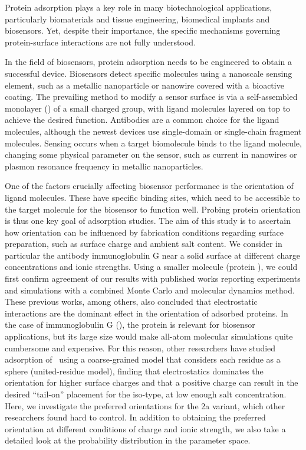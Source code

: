 
Protein adsorption plays a key role in many biotechnological applications, particularly biomaterials and tissue engineering, biomedical implants and biosensors.
Yet, despite their importance, the specific mechanisms governing protein-surface interactions are not fully understood.\cite{Gray2004,RabeVerdesSeegel2011}

In the field of biosensors, protein adsorption needs to be engineered to obtain a successful device. 
Biosensors detect specific molecules using a nanoscale sensing element, such as a metallic nanoparticle or nanowire covered with a bioactive coating. 
The prevailing method to modify a sensor surface is via a self-assembled monolayer (\sam) of a small charged group, with ligand molecules layered on top to achieve the desired function. 
Antibodies are a common choice for the ligand molecules, although the newest devices use single-domain or single-chain fragment molecules.\cite{ByunETal2013,TrillingETal2014} 
Sensing occurs when a target biomolecule binds to the ligand molecule,  changing some physical parameter on the sensor, such as current in nanowires or plasmon resonance frequency in metallic nanoparticles. 

One of the factors crucially affecting biosensor performance is the orientation of ligand molecules.\cite{TajimaTakaiIshihara2011,TrillingBeekwilderZuilhof2013} 
These have specific binding sites, which need to be accessible to the target molecule for the biosensor to function well.
Probing protein orientation is thus one key goal of adsorption studies.
The aim of this study is to ascertain how orientation can be influenced by fabrication conditions regarding surface preparation, such as surface charge and ambient salt content. We consider in particular the antibody immunoglobulin G near a solid surface at different charge concentrations and ionic strengths. Using a smaller molecule (protein \gb), we could first confirm agreement of our results with published works reporting experiments\cite{BaioWeidnerBaughGambleStaytonCastner2012} and  simulations with a combined Monte Carlo and molecular dynamics method.\cite{LiuLiaoZhou2013} These previous works, among others, also concluded that electrostatic interactions are the dominant effect in the orientation of adsorbed proteins. In the case of immunoglobulin G (\ig), the protein is relevant for biosensor applications, but its large size would make all-atom molecular simulations quite cumbersome and expensive. For this reason, other researchers have studied adsorption of \ig\ using a coarse-grained model that considers each residue as a sphere (united-residue model),\cite{ZhouChenJiang2003} finding that electrostatics dominates the orientation for higher surface charges and that a positive charge can result in the desired ``tail-on'' placement for the  iso-type, at low enough salt concentration. 
Here, we investigate the preferred orientations for the \ig 2a variant, which other researchers found hard to control.
In addition to obtaining the preferred orientation at different conditions of charge and ionic strength, we also take a detailed look at the probability distribution in the parameter space.

